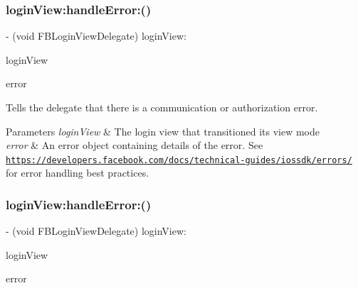 \subsubsection{\texorpdfstring{login\+View\+:handle\+Error\+:()}{loginView:handleError:()}\hspace{0.1cm}{\footnotesize\ttfamily [3/5]}}
{\footnotesize\ttfamily -\/ (void F\+B\+Login\+View\+Delegate) login\+View\+: \begin{DoxyParamCaption}\item[{(\hyperlink{interfaceFBLoginView}{F\+B\+Login\+View} $\ast$)}]{login\+View }\item[{handleError:(N\+S\+Error $\ast$)}]{error }\end{DoxyParamCaption}\hspace{0.3cm}{\ttfamily [optional]}}

Tells the delegate that there is a communication or authorization error.


\begin{DoxyParams}{Parameters}
{\em login\+View} & The login view that transitioned its view mode \\
\hline
{\em error} & An error object containing details of the error.  See \href{https://developers.facebook.com/docs/technical-guides/iossdk/errors/}{\tt https\+://developers.\+facebook.\+com/docs/technical-\/guides/iossdk/errors/} for error handling best practices. \\
\hline
\end{DoxyParams}
\mbox{\label{protocolFBLoginViewDelegate_01-p_a4cc27024e9c1fac02fbc65fd6bfba993}} 
\subsubsection{\texorpdfstring{login\+View\+:handle\+Error\+:()}{loginView:handleError:()}\hspace{0.1cm}{\footnotesize\ttfamily [4/5]}}
{\footnotesize\ttfamily -\/ (void F\+B\+Login\+View\+Delegate) login\+View\+: \begin{DoxyParamCaption}\item[{(\hyperlink{interfaceFBLoginView}{F\+B\+Login\+View} $\ast$)}]{login\+View }\item[{handleError:(N\+S\+Error $\ast$)}]{error }\end{DoxyParamCaption}\hspace{0.3cm}{\ttfamily [optional]}}

